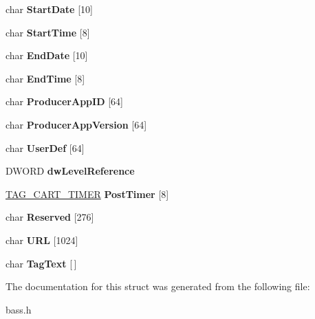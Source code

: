 \begin{DoxyCompactItemize}
\item 
\hypertarget{structTAG__CART_a398f93f20700eff5b0b6b1e1ce47c07b}{}char {\bfseries Start\+Date} \mbox{[}10\mbox{]}\label{structTAG__CART_a398f93f20700eff5b0b6b1e1ce47c07b}

\item 
\hypertarget{structTAG__CART_a41a032ad3086e6aa92ef00d14ba94ca7}{}char {\bfseries Start\+Time} \mbox{[}8\mbox{]}\label{structTAG__CART_a41a032ad3086e6aa92ef00d14ba94ca7}

\item 
\hypertarget{structTAG__CART_ac5aa7db0fe719e3f40791df75a4081db}{}char {\bfseries End\+Date} \mbox{[}10\mbox{]}\label{structTAG__CART_ac5aa7db0fe719e3f40791df75a4081db}

\item 
\hypertarget{structTAG__CART_ab333ddc91a738a2e0eab9b8cfd05038f}{}char {\bfseries End\+Time} \mbox{[}8\mbox{]}\label{structTAG__CART_ab333ddc91a738a2e0eab9b8cfd05038f}

\item 
\hypertarget{structTAG__CART_a6d746ca7409403ae18de2adfff7af59e}{}char {\bfseries Producer\+App\+I\+D} \mbox{[}64\mbox{]}\label{structTAG__CART_a6d746ca7409403ae18de2adfff7af59e}

\item 
\hypertarget{structTAG__CART_a8b74d0fe804ab08b5cac68788704b7e4}{}char {\bfseries Producer\+App\+Version} \mbox{[}64\mbox{]}\label{structTAG__CART_a8b74d0fe804ab08b5cac68788704b7e4}

\item 
\hypertarget{structTAG__CART_a0283cb1d4dac674053a4862da0d65837}{}char {\bfseries User\+Def} \mbox{[}64\mbox{]}\label{structTAG__CART_a0283cb1d4dac674053a4862da0d65837}

\item 
\hypertarget{structTAG__CART_a3776ebc4bdd93cbfc5bb08e101a508fa}{}D\+W\+O\+R\+D {\bfseries dw\+Level\+Reference}\label{structTAG__CART_a3776ebc4bdd93cbfc5bb08e101a508fa}

\item 
\hypertarget{structTAG__CART_a4ef8406d1bb1cfdfde5efa7ece8e29b8}{}\hyperlink{structTAG__CART__TIMER}{T\+A\+G\+\_\+\+C\+A\+R\+T\+\_\+\+T\+I\+M\+E\+R} {\bfseries Post\+Timer} \mbox{[}8\mbox{]}\label{structTAG__CART_a4ef8406d1bb1cfdfde5efa7ece8e29b8}

\item 
\hypertarget{structTAG__CART_a2fbf4510eba93d1af704746688a75f76}{}char {\bfseries Reserved} \mbox{[}276\mbox{]}\label{structTAG__CART_a2fbf4510eba93d1af704746688a75f76}

\item 
\hypertarget{structTAG__CART_a9982f729f68b2da136291aed1e708bcd}{}char {\bfseries U\+R\+L} \mbox{[}1024\mbox{]}\label{structTAG__CART_a9982f729f68b2da136291aed1e708bcd}

\item 
\hypertarget{structTAG__CART_a972e2ed56e14fba4194c3d03d6eabc3c}{}char {\bfseries Tag\+Text} \mbox{[}$\,$\mbox{]}\label{structTAG__CART_a972e2ed56e14fba4194c3d03d6eabc3c}

\end{DoxyCompactItemize}


The documentation for this struct was generated from the following file\+:\begin{DoxyCompactItemize}
\item 
bass.\+h\end{DoxyCompactItemize}
